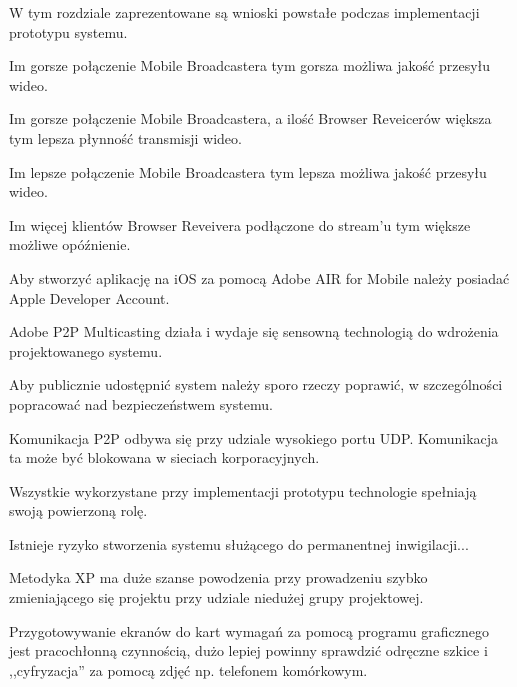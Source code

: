 W tym rozdziale zaprezentowane są wnioski powstałe podczas implementacji prototypu systemu.

\begin{packed_item}
    \item{Im gorsze połączenie Mobile Broadcastera tym gorsza możliwa jakość przesyłu wideo.}
    \item{Im gorsze połączenie Mobile Broadcastera, a ilość Browser Reveicerów większa tym lepsza płynność transmisji wideo.}
    \item{Im lepsze połączenie Mobile Broadcastera tym lepsza możliwa jakość przesyłu wideo.}
    \item{Im więcej klientów Browser Reveivera podłączone do stream'u tym większe możliwe opóźnienie.}
    \item{Aby stworzyć aplikację na iOS za pomocą Adobe AIR for Mobile należy posiadać Apple Developer Account.}
    \item{Adobe P2P Multicasting działa i wydaje się sensowną technologią do wdrożenia projektowanego systemu.}
    \item{Aby publicznie udostępnić system należy sporo rzeczy poprawić, w szczególności popracować nad bezpieczeństwem systemu.}
    \item{Komunikacja P2P odbywa się przy udziale wysokiego portu UDP. Komunikacja ta może być blokowana w sieciach korporacyjnych.}
    \item{Wszystkie wykorzystane przy implementacji prototypu technologie spełniają swoją powierzoną rolę.}
    \item{Istnieje ryzyko stworzenia systemu służącego do permanentnej inwigilacji...}
    \item{Metodyka XP ma duże szanse powodzenia przy prowadzeniu szybko zmieniającego się projektu przy udziale niedużej grupy projektowej.}
    \item{Przygotowywanie ekranów do kart wymagań za pomocą programu graficznego jest pracochłonną czynnością, dużo lepiej powinny sprawdzić odręczne szkice i ,,cyfryzacja'' za pomocą zdjęć np. telefonem komórkowym.}
\end{packed_item}
